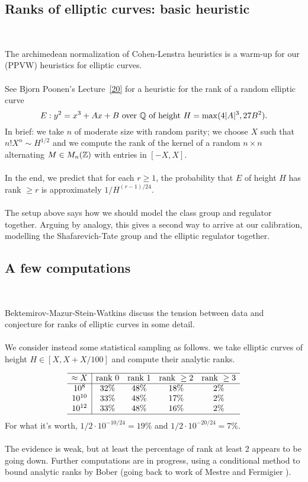 \documentclass[12pt,amsfont]{amsart}
\begin{document}
\subsection{Ranks of elliptic curves: basic heuristic}
{\ }

The archimedean normalization of Cohen-Lenstra heuristics is a warm-up for our (PPVW) heuristics for elliptic curves. \\ \\
See Bjorn Poonen's Lecture~\ref{20} for a heuristic for the rank of a random elliptic curve
\[E: y^2 = x^3 + Ax + B \text{ over } {\mathbb Q} \text{ of height } H = \max(4|A|^3, 27B^2). \]
In brief: we take $n$ of moderate size with random parity; we choose $X$ such that $n! X^n \sim H^{1/2}$ and we compute the rank of the kernel of a random $n \times n$ alternating $M \in M_n({\mathbb Z})$ with entries in $[-X, X]$. \\ \\
In the end, we predict that for each $r \geq 1$, the probability that $E$ of height $H$ has rank $\geq r$ is approximately $1/H^{(r-1)/24}.$\\ \\
The setup above says how we should model the class group and regulator together. Arguing by analogy, this gives a second way to arrive at our calibration, modelling the Shafarevich-Tate group and the elliptic regulator together.


\subsection{A few computations}
{\ }

Bektemirov-Mazur-Stein-Watkins  discuss the tension between data and conjecture for ranks of elliptic curves in some detail. \\ \\
We consider instead some statistical sampling as follows. we take elliptic curves of height $H \in [X, X+X/100]$ and compute their analytic ranks. 

\[ \begin{array}{c|cccc} 
\hline
\approx X & \text{rank } 0 & \text{rank } 1 & \text{rank } \ge 2 & \text{rank } \ge 3 \\
\hline
10^8 & 32\% & 48\% & 18\% & 2\% \\
10^{10} & 33\% & 48\% & 17\% &2 \% \\
10^{12} & 33\% & 48 \% & 16 \% &2 \% \\
\hline
\end{array}
\]
For what it's worth, $1/2 \cdot 10^{-10/24} = 19\%$ and $1/2 \cdot 10^{-20/24} = 7\%$. \\ \\
The evidence is weak, but at least the percentage of rank at least 2 appears to be going down. Further computations are in progress, using a conditional method to bound analytic ranks by Bober  (going back to work of Mestre and Fermigier ). 
\end{document}
